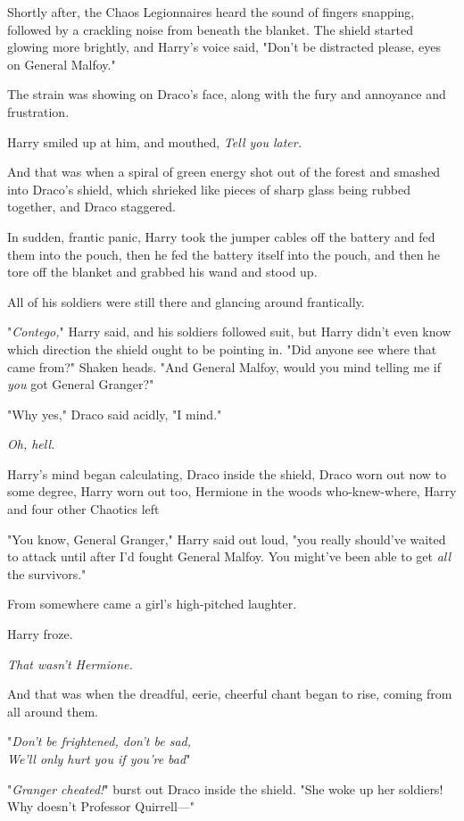 Shortly after, the Chaos Legionnaires heard the sound of fingers snapping,
followed by a crackling noise from beneath the blanket. The shield started
glowing more brightly, and Harry's voice said, "Don't be distracted please,
eyes on General \mbox{Malfoy}."

The strain was showing on Draco's face, along with the fury and annoyance and
frustration.

Harry smiled up at him, and mouthed, \emph{Tell you later.}

And that was when a spiral of green energy shot out of the forest and smashed
into Draco's shield, which shrieked like pieces of sharp glass being rubbed
together, and Draco staggered.

In sudden, frantic panic, Harry took the jumper cables off the battery and fed
them into the pouch, then he fed the battery itself into the pouch, and then he
tore off the blanket and grabbed his wand and stood up.

All of his soldiers were still there and glancing around frantically.

"\emph{Contego,}" Harry said, and his soldiers followed suit, but Harry didn't
even know which direction the shield ought to be pointing in. "Did anyone see
where that came from?" Shaken heads. "And General Malfoy, would you mind
telling me if \emph{you} got General Granger?"

"Why yes," Draco said acidly, "I mind."

\emph{Oh, hell.}

Harry's mind began calculating, Draco inside the shield, Draco worn out now to
some degree, Harry worn out too, Hermione in the woods who-knew-where, Harry
and four other Chaotics left{\el}

"You know, General Granger," Harry said out loud, "you really should've waited
to attack until after I'd fought General Malfoy. You might've been able to get
\emph{all} the survivors."

From somewhere came a girl's high-pitched laughter.

Harry froze.

\emph{That wasn't Hermione.}

And that was when the dreadful, eerie, cheerful chant began to rise, coming
from all around them.

"\emph{Don't be frightened, don't be sad,\\
We'll only hurt you if you're bad{\el}}"

"\emph{Granger cheated!}" burst out Draco inside the shield. "She woke up her
soldiers! Why doesn't Professor Quirrell\mbox{---}"

